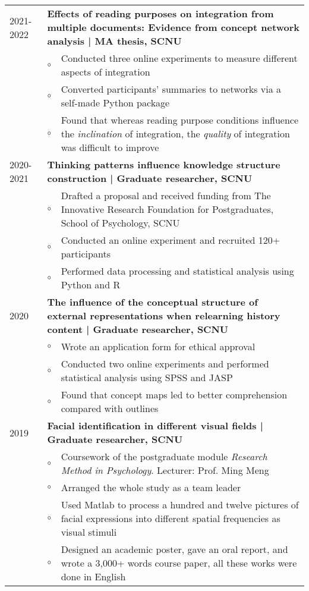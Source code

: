 \documentclass[a4paper, 12pt]{article}
\begin{document}
\begin{tabularx}{\textwidth}{p{2cm} p{0.1cm} X}

    2021-2022 & \multicolumn{2}{X}{\textbf{Effects of reading purposes on integration from multiple documents: Evidence from concept network analysis | MA thesis, SCNU}} \\
    & $\circ$ & Conducted three online experiments to measure different aspects of integration \\
    & $\circ$ & Converted participants' summaries to networks via a self-made Python package\\
    & $\circ$ & Found that whereas reading purpose conditions influence the \textit{inclination} of integration, the \textit{quality} of integration was difficult to improve  \\

    2020-2021 & \multicolumn{2}{X}{\textbf{Thinking patterns influence knowledge structure construction | Graduate researcher, SCNU}} \\
    & $\circ$ & Drafted a proposal and received funding from The Innovative Research Foundation for Postgraduates, School of Psychology, SCNU \\
    & $\circ$ & Conducted an online experiment and recruited 120+ participants  \\
    & $\circ$ & Performed data processing and statistical analysis using Python and R \\
    
    2020 & \multicolumn{2}{X}{\textbf{The influence of the conceptual structure of external representations when relearning history content | Graduate researcher, SCNU}} \\
    & $\circ$ & Wrote an application form for ethical approval \\
    & $\circ$ & Conducted two online experiments and performed statistical analysis using SPSS and JASP \\
    & $\circ$ & Found that concept maps led to better comprehension compared with outlines \\

    2019 & \multicolumn{2}{X}{\textbf{Facial identification in different visual fields | Graduate researcher, SCNU}} \\
    & $\circ$ & Coursework of the postgraduate module \textit{Research Method in Psychology}. Lecturer: Prof. Ming Meng \\ 
    & $\circ$ & Arranged the whole study as a team leader \\
    & $\circ$ & Used Matlab to process a hundred and twelve pictures of facial expressions into different spatial frequencies as visual stimuli \\
    & $\circ$ & Designed an academic poster, gave an oral report, and wrote a 3,000+ words course paper, all these works were done in English \\
    


\end{tabularx}
\end{document}
